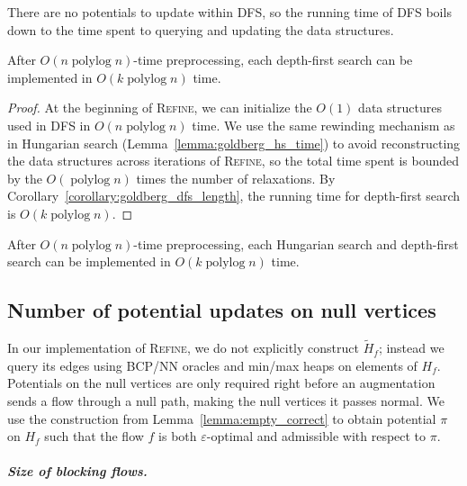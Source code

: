 \documentclass[a4paper,UKenglish]{socg-lipics-v2018}
\def\polylog{\mathop{\mathrm{polylog}}}
\def\eps{\varepsilon}
\theoremstyle{plain}
\numberwithin{figure}{section}
\renewcommand{\paragraph}{\subparagraph}
\begin{document}
\begin{toappendix}
There are no potentials to update within \textsc{DFS}, so the running time of
\textsc{DFS} boils down to the time spent to querying and updating the data
structures.

\begin{lemmarep}
\label{lemma:goldberg_dfs_time}
After $O(n \polylog n)$-time preprocessing,
each depth-first search can be implemented in $O(k \polylog n)$ time.
\end{lemmarep}

\begin{proof}
At the beginning of \textsc{Refine}, we can initialize the $O(1)$ data
structures used in \textsc{DFS} in $O(n\polylog n)$ time.
We use the same rewinding mechanism as in Hungarian search
(Lemma~\ref{lemma:goldberg_hs_time}) to avoid reconstructing the data
structures across iterations of \textsc{Refine}, so the total time spent
is bounded by the $O(\polylog n)$ times the number of relaxations.
By Corollary~\ref{corollary:goldberg_dfs_length}, the running time for depth-first search is $O(k\polylog n)$.
\end{proof}

\end{toappendix}

\begin{lemma}
After $O(n \polylog n)$-time preprocessing,
each Hungarian search and depth-first search can be implemented in $O(k \polylog n)$ time.
\end{lemma}


\subsection{Number of potential updates on null vertices}

In our implementation of \textsc{Refine}, we do not explicitly construct $\tilde{H}_f$; instead we query its edges using BCP/NN
oracles and min/max heaps on elements of $H_f$.
Potentials on the null vertices are only required right before an augmentation sends a flow through a
null path, making the null vertices it passes normal.
We use the construction from Lemma~\ref{lemma:empty_correct}
to obtain potential $\pi$ on $H_f$ such that the flow $f$ is both $\eps$-optimal and admissible with respect to $\pi$.

\paragraph{Size of blocking flows.}
\end{document}
